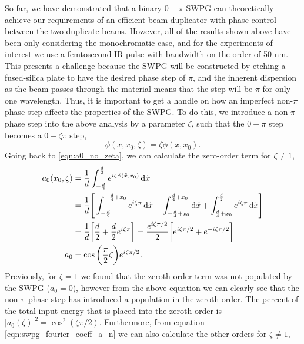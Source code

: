 So far, we have demonstrated that a binary $0-\pi$ SWPG can theoretically achieve our requirements of an efficient beam duplicator with phase control between the two duplicate beams.  However, all of the results shown above have been only considering the monochromatic case, and for the experiments of interest we use a femtosecond IR pulse with bandwidth on the order of 50 nm.  This presents a challenge because the SWPG will be constructed by etching a fused-silica plate to have the desired phase step of $\pi$, and the inherent dispersion as the beam passes through the material means that the step will be $\pi$ for only one wavelength.  Thus, it is important to get a handle on how an imperfect non-$\pi$ phase step affects the properties of the SWPG.  To do this, we introduce a non-$\pi$ phase step into the above analysis by a parameter $\zeta$, such that the $0-\pi$ step becomes a $0-\zeta\pi$ step,
\begin{equation}
\label{eqn:zeta}
	\phi(x,x_0,\zeta)=\zeta \phi(x,x_0).
\end{equation}
Going back to \ref{eqn:a0_no_zeta}, we can calculate the zero-order term for $\zeta\neq1$,
\begin{equation}
\label{eqn:a_0_zeta}
	\begin{aligned}
	a_0(x_0,\zeta) &= \frac{1}{d}\int_{-\frac{d}{2}}^{\frac{d}{2}} e^{i\zeta\phi(\tilde{x},x_0)}\mathop{}\!\mathrm{d}\tilde{x}\\
	&= \frac{1}{d}\Bigg[\int_{-\frac{d}{2}}^{-\frac{d}{4}+x_0}e^{i\zeta\pi}\mathop{}\!\mathrm{d}\tilde{x}
	+ \int_{-\frac{d}{4}+x_0}^{\frac{d}{4}+x_0} \mathop{}\!\mathrm{d}\tilde{x}
	+ \int_{\frac{d}{4}+x_0}^{\frac{d}{2}} e^{i\zeta\pi}\mathop{}\!\mathrm{d}\tilde{x} \Bigg]\\
	&=\frac{1}{d} \bigg[\frac{d}{2} + \frac{d}{2}e^{i\zeta\pi} \bigg] = \frac{e^{i\zeta\pi/2}}{2}\bigg[ e^{i\zeta\pi/2} 
	+ e^{-i\zeta\pi/2}\bigg]\\
	a_0 & = \cos\bigg(\frac{\pi}{2}\zeta\bigg)e^{i\zeta\pi/2}.
	\end{aligned}
\end{equation}
Previously, for $\zeta=1$ we found that the zeroth-order term was not populated by the SWPG ($a_0=0$), however from the above equation we can clearly see that the non-$\pi$ phase step has introduced a population in the zeroth-order.  The percent of the total input energy that is placed into the zeroth order is $\rvert a_0(\zeta)\rvert^2=\cos^2(\zeta\pi/2)$. Furthermore, from equation \ref{eqn:swpg_fourier_coeff_a_n} we can also calculate the other orders for $\zeta\neq1$,

